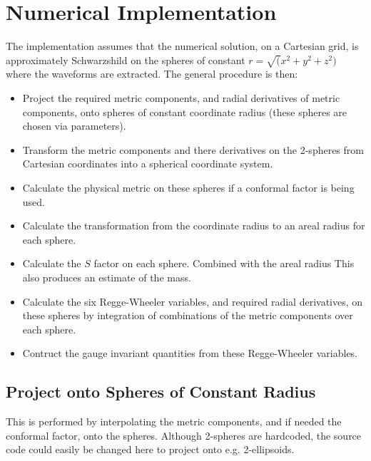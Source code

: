 \section{Numerical Implementation}

The implementation assumes that the numerical solution, on a Cartesian
grid, is approximately Schwarzshild on the spheres of constant
$r=\sqrt(x^2+y^2+z^2)$ where the waveforms are extracted. The general
procedure is then:

\begin{itemize}

  \item Project the required metric components, and radial derivatives
  of metric components, onto spheres of constant coordinate radius
  (these spheres are chosen via parameters).

  \item Transform the metric components and there derivatives on the
  2-spheres from Cartesian coordinates into a spherical coordinate
  system.

  \item Calculate the physical metric on these spheres if a conformal
  factor is being used.

  \item Calculate the transformation from the coordinate radius to an
  areal radius for each sphere.

  \item Calculate the $S$ factor on each sphere. Combined with the
  areal radius This also produces an estimate of the mass.

  \item Calculate the six Regge-Wheeler variables, and required radial
  derivatives, on these spheres by integration of combinations of the
  metric components over each sphere.

  \item Contruct the gauge invariant quantities from these
  Regge-Wheeler variables.

\end{itemize}

\subsection{Project onto Spheres of Constant Radius}

This is performed by interpolating the metric components, and if
needed the conformal factor, onto the spheres. Although 2-spheres are
hardcoded, the source code could easily be changed here to project
onto e.g. 2-ellipsoids.


